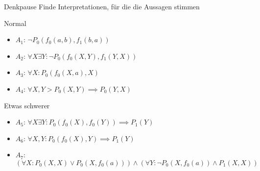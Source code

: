 {
\begin{frame}{Denkpause}
	Finde Interpretationen, für die die Aussagen stimmen
	\begin{block}{Normal}
		\begin{itemize}
			\item $A_1$: $\lnot P_0(f_0(a,b), f_1(b,a))$
			\item $A_2$: $\forall X \exists Y: \lnot P_0(f_0(X,Y), f_1(Y,X))$
			\item $A_3$: $\forall X: P_0(f_0(X,a),X)$
			\item $A_4$: $\forall X,Y> P_0(X,Y) \implies P_0(Y,X)$
		\end{itemize}
	\end{block}

	\begin{block}{Etwas schwerer}
		\begin{itemize}
			\item $A_5$: $\forall X \exists Y: P_0(f_0(X), f_0(Y)) \implies P_1(Y)$
			\item $A_6$: $\forall X, Y: P_0(f_0(X), Y) \implies P_1(Y)$
			\item $A_7$: $\left(\forall X : P_0(X,X) \lor P_0(X,f_0(a))\right) \land \left(\forall Y : \lnot P_0(X,f_0(a)) \land P_1(X,X) \right)$
		\end{itemize}
	\end{block}
\end{frame}

}
